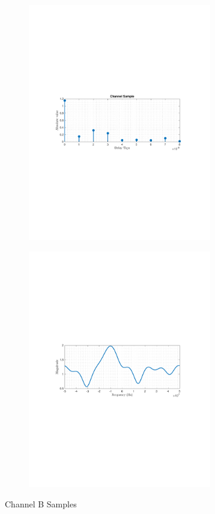 \begin{figure}
    \centering
    \begin{subfigure}[b]{8cm}
    \includegraphics[trim={3cm 10.7cm 3cm 10cm},clip, width=8cm]{figures/TimeSample_2.pdf}
    \end{subfigure}
    \begin{subfigure}[b]{8 cm}
    \includegraphics[trim={3cm 10.7cm 3cm 10cm},clip, width=8cm]{figures/FreqSample_2.pdf}   
    \end{subfigure}
    \caption{Channel B Samples}
    \label{fig:channel-samples}
\end{figure}

